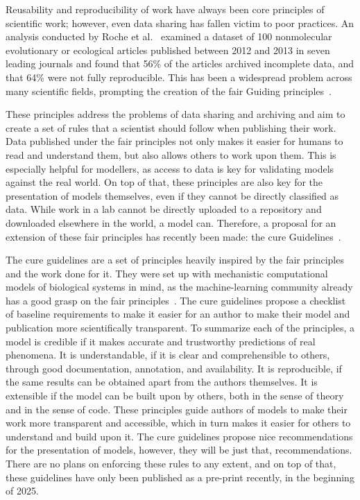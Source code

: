 Reusability and reproducibility of work have always been core principles of scientific work; however, even data sharing has fallen victim to poor practices. An analysis conducted by Roche et al.~\cite{rochePublicDataArchiving2015} examined a dataset of 100 nonmolecular evolutionary or ecological articles published between 2012 and 2013 in seven leading journals and found that 56\% of the articles archived incomplete data, and that 64\% were not fully reproducible. This has been a widespread problem across many scientific fields, prompting the creation of the \gls{fair} Guiding principles~\cite{wilkinsonFAIRGuidingPrinciples2016}. 

These principles address the problems of data sharing and archiving and aim to create a set of rules that a scientist should follow when publishing their work. Data published under the \gls{fair} principles not only makes it easier for humans to read and understand them, but also allows others to work upon them. This is especially helpful for modellers, as access to data is key for validating models against the real world. On top of that, these principles are also key for the presentation of models themselves, even if they cannot be directly classified as data. While work in a lab cannot be directly uploaded to a repository and downloaded elsewhere in the world, a model can. Therefore, a proposal for an extension of these \gls{fair} principles has recently been made: the \gls{cure} Guidelines~\cite{sauroFAIRCUREGuidelines2025}.

The \gls{cure} guidelines are a set of principles heavily inspired by the \gls{fair} principles and the work done for it. They were set up with mechanistic computational models of biological systems in mind, as the machine-learning community already has a good grasp on the \gls{fair} principles~\cite{raviFAIRPrinciplesAI2022}. The \gls{cure} guidelines propose a checklist of baseline requirements to make it easier for an author to make their model and publication more scientifically transparent. To summarize each of the principles, a model is credible if it makes accurate and trustworthy predictions of real phenomena. It is understandable, if it is clear and comprehensible to others, through good documentation, annotation, and availability. It is reproducible, if the same results can be obtained apart from the authors themselves. It is extensible if the model can be built upon by others, both in the sense of theory and in the sense of code. These principles guide authors of models to make their work more transparent and accessible, which in turn makes it easier for others to understand and build upon it. The \gls{cure} guidelines propose nice recommendations for the presentation of models, however, they will be just that, recommendations. There are no plans on enforcing these rules to any extent, and on top of that, these guidelines have only been published as a pre-print recently, in the beginning of 2025.

